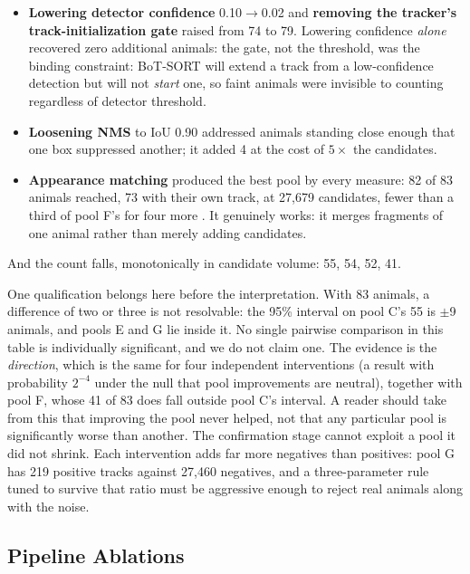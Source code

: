\begin{itemize}[leftmargin=*,labelsep=4.5mm]
\item \textbf{Lowering detector confidence} 0.10$\to$0.02 and \textbf{removing the tracker's
track-ini\-tial\-i\-za\-tion gate} raised \reachedq from 74 to 79. Lowering confidence \emph{alone}
recovered zero additional animals: the gate, not the threshold, was the binding constraint: BoT-SORT will extend a track from a low-confidence detection but will not \emph{start}
one, so faint animals were invisible to counting regardless of detector threshold.
\item \textbf{Loosening NMS} to IoU 0.90 addressed animals standing close enough that one
box suppressed another; it added 4 \primaryq at the cost of $5\times$ the candidates.
\item \textbf{Appearance matching} produced the best pool by every measure: 82 of
83 animals reached, 73 with their own track, at 27,679 candidates, fewer than a third of
pool F's for four more \primaryq. It genuinely works: it merges fragments of one animal
rather than merely adding candidates.
\end{itemize}

And the count falls, monotonically in candidate volume: 55, 54, 52, 41.

One qualification belongs here before the interpretation. With 83 animals, a difference of two
or three is not resolvable: the 95\% interval on pool C's 55 is $\pm$9 animals, and pools E and
G lie inside it. No single pairwise comparison in this table is individually significant, and
we do not claim one. The evidence is the \emph{direction}, which is the same for four independent interventions (a result with probability $2^{-4}$ under the null that pool improvements are neutral), together with pool F, whose 41 of 83 does fall outside pool C's
interval. A reader should take from this that improving the pool never helped, not that any
particular pool is significantly worse than another. The confirmation
stage cannot exploit a pool it did not shrink. Each intervention adds far more negatives than positives: pool G has 219 positive tracks against 27,460 negatives, and a
three-parameter rule tuned to survive that ratio must be aggressive enough to reject real
animals along with the noise.

\subsection{Pipeline Ablations}
\label{sec:ablations}

